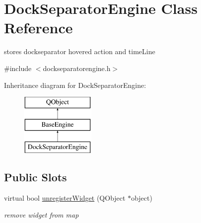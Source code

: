 \hypertarget{class_dock_separator_engine}{}\section{Dock\+Separator\+Engine Class Reference}
\label{class_dock_separator_engine}


stores dockseparator hovered action and time\+Line  




{\ttfamily \#include $<$dockseparatorengine.\+h$>$}

Inheritance diagram for Dock\+Separator\+Engine\+:\begin{figure}[H]
\begin{center}
\leavevmode
\includegraphics[height=3.000000cm]{class_dock_separator_engine}
\end{center}
\end{figure}
\subsection*{Public Slots}
\begin{DoxyCompactItemize}
\item 
\mbox{\label{class_dock_separator_engine_a820b2af388e56b5a196464c05bc5075c}} 
virtual bool \hyperlink{class_dock_separator_engine_a820b2af388e56b5a196464c05bc5075c}{unregister\+Widget} (Q\+Object $\ast$object)
\begin{DoxyCompactList}\small\item\em remove widget from map \end{DoxyCompactList}\end{DoxyCompactItemize}

